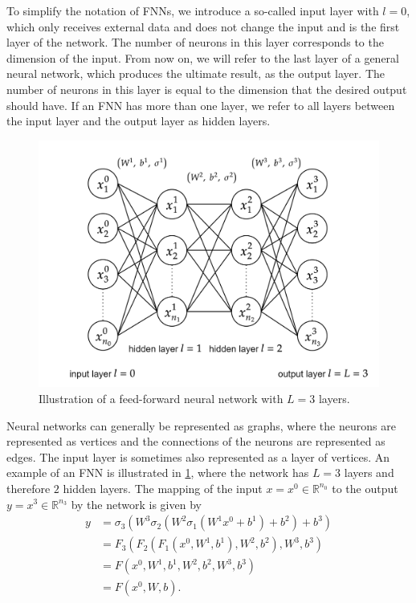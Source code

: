 To simplify the notation of FNNs, we introduce a so-called input layer with $l=0$, which only receives external data and does not change the input and is the first layer of the network. The number of neurons in this layer corresponds to the dimension of the input. From now on, we will refer to the last layer of a general neural network, which produces the ultimate result, as the output layer. The number of neurons in this layer is equal to the dimension that the desired output should have. If an FNN has more than one layer, we refer to all layers between the input layer and the output layer as hidden layers. \\ 
\begin{figure}[H]
    \begin{center}
        \includegraphics[scale=0.2]{img/diagram-20220206.png}
    \end{center}
    \caption{Illustration of a feed-forward neural network with $L=3$ layers.}
    \label{fig5}
\end{figure}
Neural networks can generally be represented as graphs, where the neurons are represented as vertices and the connections of the neurons are represented as edges. The input layer is sometimes also represented as a layer of vertices. An example of an FNN is illustrated in \cref{fig5}, where the network has $L=3$ layers and therefore $2$ hidden layers. The mapping of the input $x = x^0 \in \mathbb{R}^{n_0}$ to the output $y = x^3 \in \mathbb{R}^{n_3}$ by the network is given by 
\begin{equation}
    \label{forward propagation of information}
    \begin{aligned}
        y &=\sigma_{3} \left( W^{3} \sigma_{2} \left(  W^{2} \sigma_{1} \left( W^{1} x^{0}+b^{1}\right)+b^{2}\right)+b^{3}\right) \\
        &=F_{3}\left(F_{2}\left(F_{1}\left(x^{0}, W^{1}, b^{1}\right), W^{2}, b^{2}\right), W^{3}, b^{3}\right) \\
        &= F \left( x^{0}, W^{1}, b^{1}, W^{2}, b^{2}, W^{3}, b^{3} \right) \\
        & = F(x^{0}, W, b).
    \end{aligned}
\end{equation}
